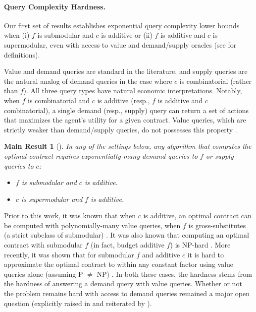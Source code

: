 \documentclass[11pt]{article}
\newtheorem{mainresult}{Main Result}
\begin{document}
\paragraph{Query Complexity Hardness.}
Our first set of results establishes exponential query complexity lower bounds when (i) $f$ is submodular and $c$ is additive or (ii) $f$ is additive and $c$ is supermodular, even with access to value and demand/supply oracles (see  for definitions). 

Value and demand queries are standard in the literature, and supply queries are the natural analog of demand queries in the case where $c$ is combinatorial (rather than $f$). All three query types have natural economic interpretations.
Notably, when $f$ is combinatorial and $c$ is additive (resp., $f$ is additive and $c$ combinatorial), a single demand (resp., supply) query can return a set of actions that maximizes the agent's utility for a given contract. 
Value queries, which are strictly weaker than demand/supply queries, do not possesses this property \cite{blumrosen2005computational}.


\begin{mainresult}[]\label{thm:main1}
In any of the settings below, any algorithm that computes the optimal contract requires exponentially-many demand queries to $f$ or supply queries to $c$: 
\begin{itemize}\setlength\itemsep{-0.25em}
    \item $f$ is submodular and $c$ is additive.
    \item $c$ is supermodular and $f$ is additive.
\end{itemize}
\end{mainresult}

Prior to this work, it was known that when $c$ is additive, an optimal contract can be computed with polynomially-many value queries, when $f$ is gross-substitutes (a strict subclass of submodular) \cite{dutting2022combinatorial}. 
It was also known that computing an optimal contract with submodular $f$ (in fact, budget additive $f$) is \textsf{NP}-hard \cite{dutting2022combinatorial}. More recently, it was shown that for submodular $f$ and additive $c$ it is hard to approximate the optimal contract to within any constant factor using value queries alone (assuming \textsf{P} $\neq$ \textsf{NP}) \cite{ezra2023Inapproximability}. 
In both these cases, the hardness stems from the hardness of answering a demand query with value queries. Whether or not the problem remains hard with access to demand queries remained a major open question (explicitly raised in \cite{dutting2022combinatorial} and reiterated by \cite{deo2024supermodular}).
\end{document}
